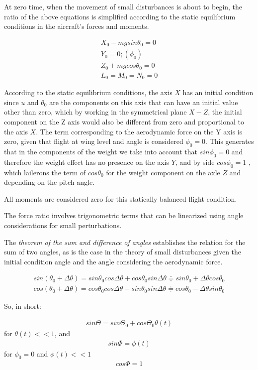 At zero time, when the movement of small disturbances is about to begin, the ratio of the above equations is simplified according to the static equilibrium conditions in the aircraft's forces and moments.

\begin{gather}
    X_0 - mg sin\theta_0 = 0 \\
    Y_0 = 0; (\phi_0) \\
    Z_0 + mg cos\theta_0 = 0 \\
    L_0 = M_0 = N_0 = 0
\end{gather}

According to the static equilibrium conditions, the axis $X$ has an initial condition since $u$ and $\theta_0$ are the components on this axis that can have an initial value other than zero, which by working in the symmetrical plane $X-Z$, the initial component on the Z axis would also be different from zero and proportional to the axis $X$. The term corresponding to the aerodynamic force on the Y axis is zero, given that flight at wing level and angle is considered $\phi_0=0$. This generates that in the components of the weight we take into account that $sin \phi_0 = 0$ and therefore the weight effect has no presence on the axis $Y$, and by side $cos \phi_0 = 1$ , which lailerons the term of $cos \theta_0$ for the weight component on the axle $Z$ and depending on the pitch angle. 

All moments are considered zero for this statically balanced flight condition. 

The force ratio involves trigonometric terms that can be linearized using angle considerations for small perturbations. 

The \textit{theorem of the sum and difference of angles} establishes the relation for the sum of two angles, as is the case in the theory of small disturbances given the initial condition angle and the angle considering the aerodynamic force. 

\begin{gather}
    sin(\theta_0 + \Delta \theta) = sin \theta_0 cos \Delta \theta + cos \theta_0 sin \Delta \theta \doteqdot sin\theta_0 + \Delta \theta cos \theta_0 \\
    cos(\theta_0 + \Delta \theta) = cos \theta_0 cos \Delta \theta - sin \theta_0 sin \Delta \theta \doteqdot cos\theta_0 - \Delta \theta sin \theta_0
\end{gather}

So, in short:

\begin{gather}
    sin\Theta = sin \Theta_0 + cos\Theta_0 \theta(t) 
\end{gather} 
for $\theta(t) << 1$, and
\begin{gather}
    sin\Phi = \phi(t)
\end{gather}
for $\phi_0 = 0$ and $\phi(t) << 1$
\begin{gather}
    cos \Phi = 1
\end{gather}

